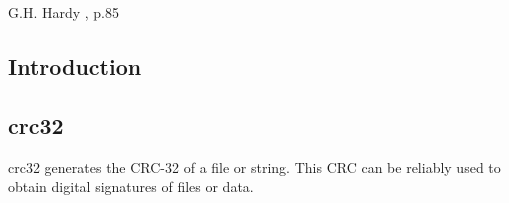 
\chapter[\ccchzeroshorttitle{}]{\ccchzerolongtitle{}}

\label{ccch0}

                   {G.H. Hardy \cite{bibref:b:mathematiciansapology:1940},
                   p.85}

\section{Introduction}


\section{crc32}

\begin{tclcommandname}{crc32}%
generates the CRC-32 of a file or string.  This CRC can be reliably used to obtain
digital signatures of files or data.
\end{tclcommandname}

\begin{tclcommandsynopsis}
\end{tclcommandsynopsis}

